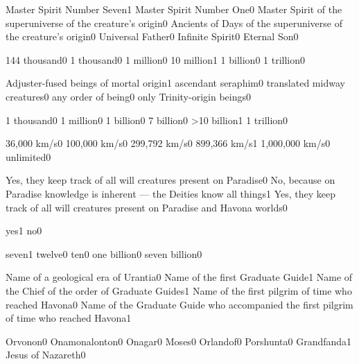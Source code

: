 {Master Spirit Number Seven}{1}
{Master Spirit Number One}{0}
{Master Spirit of the superuniverse of the creature's origin}{0}
{Ancients of Days of the superuniverse of the creature's origin}{0}
{Universal Father}{0}
{Infinite Spirit}{0}
{Eternal Son}{0}
\qstop

{144 thousand}{0}
{1 thousand}{0}
{1 million}{0}
{10 million}{1}
{1 billion}{0}
{1 trillion}{0}
\qstop

{Adjuster-fused beings of mortal origin}{1}
{ascendant seraphim}{0}
{translated midway creatures}{0}
{any order of being}{0}
{only Trinity-origin beings}{0}
\qstop

{1 thousand}{0}
{1 million}{0}
{1 billion}{0}
{7 billion}{0}
{>10 billion}{1}
{1 trillion}{0}
\qstop


{36,000 km/s}{0}
{100,000 km/s}{0}
{299,792 km/s}{0}
{899,366 km/s}{1}
{1,000,000 km/s}{0}
{unlimited}{0}
\qstop


{Yes, they keep track of all will creatures present on Paradise}{0}
{No, because on Paradise knowledge is inherent --- the Deities know all things}{1}
{Yes, they keep track of all will creatures present on Paradise and Havona worlds}{0}
\qstop

{yes}{1}
{no}{0}
\qstop

{seven}{1}
{twelve}{0}
{ten}{0}
{one billion}{0}
{seven billion}{0}
\qstop

{Name of a geological era of Urantia}{0}
{Name of the first Graduate Guide}{1}
{Name of the Chief of the order of Graduate Guides}{1}
{Name of the first pilgrim of time who reached Havona}{0}
{Name of the Graduate Guide who accompanied the first pilgrim of time who reached Havona}{1}
\qstop

{Orvonon}{0}
{Onamonalonton}{0}
{Onagar}{0}
{Moses}{0}
{Orlandof}{0}
{Porshunta}{0}
{Grandfanda}{1}
{Jesus of Nazareth}{0}
\qstop

